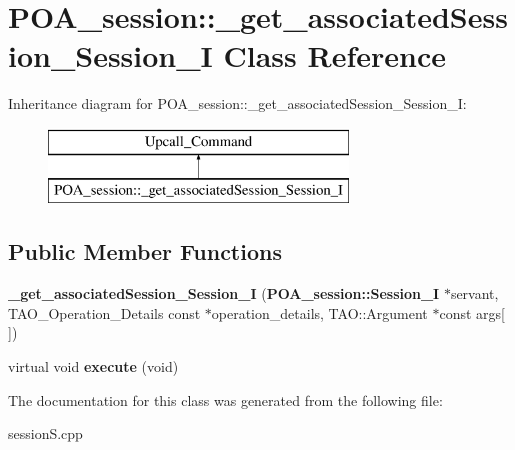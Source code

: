 \section{P\+O\+A\+\_\+session\+:\+:\+\_\+get\+\_\+associated\+Session\+\_\+\+Session\+\_\+I Class Reference}
\label{classPOA__session_1_1__get__associatedSession__Session__I}
Inheritance diagram for P\+O\+A\+\_\+session\+:\+:\+\_\+get\+\_\+associated\+Session\+\_\+\+Session\+\_\+I\+:\begin{figure}[H]
\begin{center}
\leavevmode
\includegraphics[height=2.000000cm]{classPOA__session_1_1__get__associatedSession__Session__I}
\end{center}
\end{figure}
\subsection*{Public Member Functions}
\begin{DoxyCompactItemize}
\item 
{\bfseries \+\_\+get\+\_\+associated\+Session\+\_\+\+Session\+\_\+I} ({\bf P\+O\+A\+\_\+session\+::\+Session\+\_\+I} $\ast$servant, T\+A\+O\+\_\+\+Operation\+\_\+\+Details const $\ast$operation\+\_\+details, T\+A\+O\+::\+Argument $\ast$const args[$\,$])\label{classPOA__session_1_1__get__associatedSession__Session__I_aacd0485fbe3bd937d45f796eb54672c0}

\item 
virtual void {\bfseries execute} (void)\label{classPOA__session_1_1__get__associatedSession__Session__I_a2fd314dc13714c622209588e2b06e2ee}

\end{DoxyCompactItemize}


The documentation for this class was generated from the following file\+:\begin{DoxyCompactItemize}
\item 
session\+S.\+cpp\end{DoxyCompactItemize}

